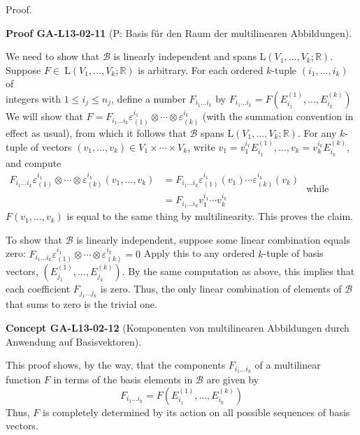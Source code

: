 \documentclass[10pt, letterpaper]{article}
\newcommand{\CustomHeading}[3]{%
  \par\medskip\noindent%
  \textbf{#1 #2} \textnormal{(#3)}.\enskip%
}
\newenvironment{CONC}[2]{\begin{unitbox}\CustomHeading{Concept}{#1}{#2}}{\end{unitbox}}
\newenvironment{PROOF}[2]{\begin{unitbox}\CustomHeading{Proof}{#1}{#2}}{\end{unitbox}}
\begin{document}
Proof. 



\begin{PROOF}{GA-L13-02-11}{P: Basis für den Raum der multilinearen Abbildungen}
We need to show that $\mathscr{B}$ is linearly independent and spans $\mathrm{L}\left(V_{1}, \ldots, V_{k} ; \mathbb{R}\right)$. Suppose $F \in \mathrm{~L}\left(V_{1}, \ldots, V_{k} ; \mathbb{R}\right)$ is arbitrary. For each ordered $k$-tuple $\left(i_{1}, \ldots, i_{k}\right)$ of\\
integers with $1 \leq i_{j} \leq n_{j}$, define a number $F_{i_{1} \ldots i_{k}}$ by
$
F_{i_{1} \ldots i_{k}}=F\left(E_{i_{1}}^{(1)}, \ldots, E_{i_{k}}^{(k)}\right)
$
We will show that
$
F=F_{i_{1} \ldots i_{k}} \varepsilon_{(1)}^{i_{1}} \otimes \cdots \otimes \varepsilon_{(k)}^{i_{k}}
$
(with the summation convention in effect as usual), from which it follows that $\mathscr{B}$ spans $\mathrm{L}\left(V_{1}, \ldots, V_{k} ; \mathbb{R}\right)$. For any $k$-tuple of vectors $\left(v_{1}, \ldots, v_{k}\right) \in V_{1} \times \cdots \times V_{k}$, write $v_{1}=v_{1}^{i_{1}} E_{i_{1}}^{(1)}, \ldots, v_{k}=v_{k}^{i_{k}} E_{i_{k}}^{(k)}$, and compute
$
\begin{aligned}
F_{i_{1} \ldots i_{k}} \varepsilon_{(1)}^{i_{1}} \otimes \cdots \otimes \varepsilon_{(k)}^{i_{k}}\left(v_{1}, \ldots, v_{k}\right) & =F_{i_{1} \ldots i_{k}} \varepsilon_{(1)}^{i_{1}}\left(v_{1}\right) \cdots \varepsilon_{(k)}^{i_{k}}\left(v_{k}\right) \\
& =F_{i_{1} \ldots i_{k}} v_{1}^{i_{1}} \cdots v_{k}^{i_{k}}
\end{aligned}
$
while $F\left(v_{1}, \ldots, v_{k}\right)$ is equal to the same thing by multilinearity. This proves the claim.

To show that $\mathscr{B}$ is linearly independent, suppose some linear combination equals zero:
$
F_{i_{1} \ldots i_{k}} \varepsilon_{(1)}^{i_{1}} \otimes \cdots \otimes \varepsilon_{(k)}^{i_{k}}=0
$
Apply this to any ordered $k$-tuple of basis vectors, $\left(E_{j_{1}}^{(1)}, \ldots, E_{j_{k}}^{(k)}\right)$. By the same computation as above, this implies that each coefficient $F_{j_{1} \ldots j_{k}}$ is zero. Thus, the only linear combination of elements of $\mathscr{B}$ that sums to zero is the trivial one.
\end{PROOF}




\begin{CONC}{GA-L13-02-12}{Komponenten von multilinearen Abbildungen durch Anwendung auf Basisvektoren}
This proof shows, by the way, that the components $F_{i_{1} \ldots i_{k}}$ of a multilinear function $F$ in terms of the basis elements in $\mathscr{B}$ are given by
$$F_{i_1 \ldots i_k}=F\left(E_{i_1}^{(1)}, \ldots, E_{i_k}^{(k)}\right)$$
Thus, $F$ is completely determined by its action on all possible sequences of basis vectors.
\end{CONC}
\end{document}
